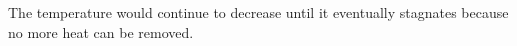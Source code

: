 The temperature would continue to decrease until it eventually stagnates because no more heat can be removed.